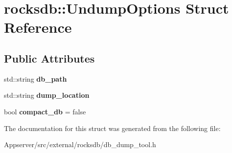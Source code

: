 \hypertarget{structrocksdb_1_1UndumpOptions}{}\section{rocksdb\+:\+:Undump\+Options Struct Reference}
\label{structrocksdb_1_1UndumpOptions}
\subsection*{Public Attributes}
\begin{DoxyCompactItemize}
\item 
std\+::string {\bfseries db\+\_\+path}\hypertarget{structrocksdb_1_1UndumpOptions_a17456520899ce6dc106a19c8e4d81445}{}\label{structrocksdb_1_1UndumpOptions_a17456520899ce6dc106a19c8e4d81445}

\item 
std\+::string {\bfseries dump\+\_\+location}\hypertarget{structrocksdb_1_1UndumpOptions_a3555c458011fc024343037912552c5c7}{}\label{structrocksdb_1_1UndumpOptions_a3555c458011fc024343037912552c5c7}

\item 
bool {\bfseries compact\+\_\+db} = false\hypertarget{structrocksdb_1_1UndumpOptions_a14b82b7ba21ae9cf06d79497952b48e3}{}\label{structrocksdb_1_1UndumpOptions_a14b82b7ba21ae9cf06d79497952b48e3}

\end{DoxyCompactItemize}


The documentation for this struct was generated from the following file\+:\begin{DoxyCompactItemize}
\item 
Appserver/src/external/rocksdb/db\+\_\+dump\+\_\+tool.\+h\end{DoxyCompactItemize}
